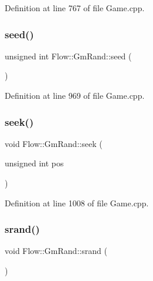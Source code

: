 Definition at line 767 of file Game.\+cpp.

\hypertarget{class_flow_1_1_gm_rand_a8a8b7dafe3991717c68beb1f13409f77}{}\label{class_flow_1_1_gm_rand_a8a8b7dafe3991717c68beb1f13409f77} 
\subsubsection{\texorpdfstring{seed()}{seed()}}
{\footnotesize\ttfamily unsigned int Flow\+::\+Gm\+Rand\+::seed (\begin{DoxyParamCaption}{ }\end{DoxyParamCaption})}



Definition at line 969 of file Game.\+cpp.

\hypertarget{class_flow_1_1_gm_rand_a109fe067556f62419afe48f11048acf5}{}\label{class_flow_1_1_gm_rand_a109fe067556f62419afe48f11048acf5} 
\subsubsection{\texorpdfstring{seek()}{seek()}}
{\footnotesize\ttfamily void Flow\+::\+Gm\+Rand\+::seek (\begin{DoxyParamCaption}\item[{unsigned int}]{pos }\end{DoxyParamCaption})}



Definition at line 1008 of file Game.\+cpp.

\hypertarget{class_flow_1_1_gm_rand_aadd656b294e8e7330ba408486646e2f3}{}\label{class_flow_1_1_gm_rand_aadd656b294e8e7330ba408486646e2f3} 
\subsubsection{\texorpdfstring{srand()}{srand()}\hspace{0.1cm}{\footnotesize\ttfamily [1/2]}}
{\footnotesize\ttfamily void Flow\+::\+Gm\+Rand\+::srand (\begin{DoxyParamCaption}{ }\end{DoxyParamCaption})}



